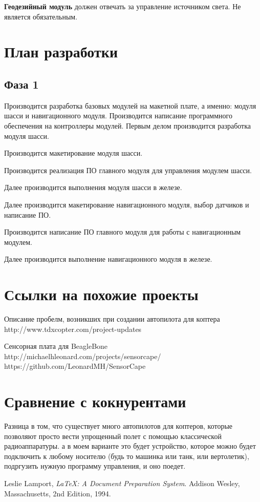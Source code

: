 \documentclass[utf8]{report}
\begin{document}
\textbf{Геодезийный модуль} должен отвечать за управление источником света. Не является обязательным.

\chapter{План разработки}

\section{Фаза 1}

Производится разработка базовых модулей на макетной плате, а именно: модуля шасси и навигационного модуля. Производится написание программного обеспечения на контроллеры модулей. Первым делом производится разработка модуля шасси.

Производится макетирование модуля шасси.

Производится реализация ПО главного модуля для управления модулем шасси.

Далее производится выполнения модуля шасси в железе.

Далее производится макетирование навигационного модуля, выбор датчиков и написание ПО.

Производится написание ПО главного модуля для работы с навигационным модулем.

Далее производится выполнение навигационного модуля в железе.


\chapter{Ссылки на похожие проекты}

Описание пробелм, возникших при создании автопилота для коптера
http://www.tdxcopter.com/project-updates

Сенсорная плата для BeagleBone
http://michaelhleonard.com/projects/sensorcape/
https://github.com/LeonardMH/SensorCape

\chapter{Сравнение с кокнурентами}

Разница в том, что существует много автопилотов для коптеров, которые позволяют просто вести упрощенный полет с помощью классической радиоаппаратуры. а в моем варианте это будет устройство, которое можно будет подключить к любому носителю (будь то машинка или танк, или вертолетик), подргузить нужную программу управления, и оно поедет.

\begin{thebibliography}{9}
      Leslie Lamport,
      \emph{\LaTeX: A Document Preparation System}.
      Addison Wesley, Massachusetts,
      2nd Edition,
      1994.
 
\end{thebibliography}
 
\end{document}
